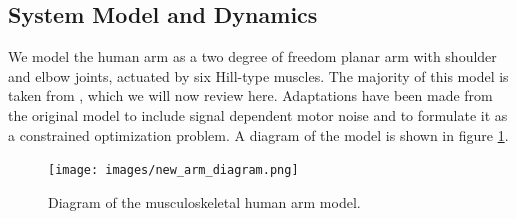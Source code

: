 \documentclass[letterpaper, 10pt, conference]{ieeeconf}
\begin{document}
\subsection{System Model and Dynamics}
We model the human arm as a two degree of freedom planar arm with shoulder and elbow joints, actuated by six Hill-type muscles. The majority of this model is taken from \cite{stochastic_model}, which we will now review here. Adaptations have been made from the original model to include signal dependent motor noise and to formulate it as a constrained optimization problem. A diagram of the model is shown in figure \ref{fig:arm_model}. 

\begin{figure}[h]
    \centering
    \texttt{[image: images/new\_arm\_diagram.png]}
    \caption{Diagram of the musculoskeletal human arm model. }
    \label{fig:arm_model}
\end{figure}
\end{document}

